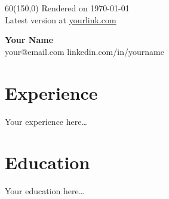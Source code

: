 \documentclass[a4paper]{article}
\newcommand{\lastupdated}{%
  \begin{textblock}{60}(150,0)
    \color{datecolor}\fontsize{8pt}{10pt}\selectfont
    Rendered on \today \\
    Latest version at \href{https://yourlink.com}{yourlink.com}
  \end{textblock}%
}
\begin{document}
\lastupdated

\begin{center}
  {\LARGE\bfseries Your Name}\\[4pt]
  your@email.com \quad linkedin.com/in/yourname
\end{center}

\section*{Experience}
Your experience here\ldots

\section*{Education}
Your education here\ldots
\end{document}
